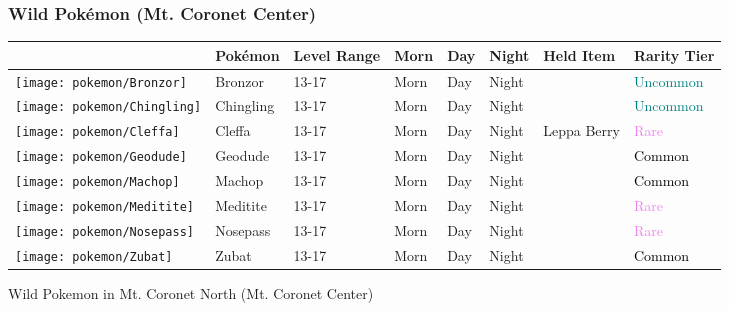 \subsubsection{Wild Pokémon (Mt. Coronet Center)}%
\label{ssubsec:WildPokmon(Mt.CoronetCenter)}%
\begin{longtable}{||l l l l l l l l||}%
\hline%
&Pokémon&Level Range&Morn&Day&Night&Held Item&Rarity Tier\\%
\hline%
\endhead%
\hline%
\texttt{[image: pokemon/Bronzor]}&Bronzor&13{-}17&Morn&Day&Night&&\textcolor{teal}{%
Uncommon%
}\\%
\hline%
\texttt{[image: pokemon/Chingling]}&Chingling&13{-}17&Morn&Day&Night&&\textcolor{teal}{%
Uncommon%
}\\%
\hline%
\texttt{[image: pokemon/Cleffa]}&Cleffa&13{-}17&Morn&Day&Night&Leppa Berry&\textcolor{violet}{%
Rare%
}\\%
\hline%
\texttt{[image: pokemon/Geodude]}&Geodude&13{-}17&Morn&Day&Night&&\textcolor{black}{%
Common%
}\\%
\hline%
\texttt{[image: pokemon/Machop]}&Machop&13{-}17&Morn&Day&Night&&\textcolor{black}{%
Common%
}\\%
\hline%
\texttt{[image: pokemon/Meditite]}&Meditite&13{-}17&Morn&Day&Night&&\textcolor{violet}{%
Rare%
}\\%
\hline%
\texttt{[image: pokemon/Nosepass]}&Nosepass&13{-}17&Morn&Day&Night&&\textcolor{violet}{%
Rare%
}\\%
\hline%
\texttt{[image: pokemon/Zubat]}&Zubat&13{-}17&Morn&Day&Night&&\textcolor{black}{%
Common%
}\\%
\hline%
\end{longtable}%
\caption{Wild Pokemon in Mt. Coronet North (Mt. Coronet Center)}